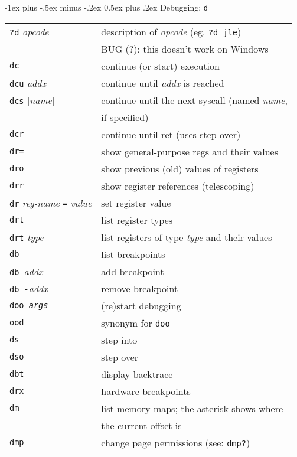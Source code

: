 \documentclass[a4paper,landscape]{article}
\makeatletter
\renewcommand{\section}{\@startsection{section}{1}{0mm}%
                                {-1ex plus -.5ex minus -.2ex}%
                                {0.5ex plus .2ex}%
                                {\normalfont\large\bfseries}}
\makeatother
\begin{document}
\begin{multicols*}{3}
\section{Debugging: \texttt{d}}
\begin{tabular}{@{}ll@{}}
\texttt{?d} \textit{opcode} & description of \textit{opcode} (eg. \texttt{?d jle}) \\ & BUG (?): this doesn't work on Windows \\
\texttt{dc} & continue (or start) execution \\
\texttt{dcu} \textit{addx} & continue until \textit{addx} is reached \\
\texttt{dcs} [\textit{name}] & continue until the next syscall (named \textit{name}, \\ & if specified) \\
\texttt{dcr} & continue until ret (uses step over) \\
\texttt{dr=} & show general-purpose regs and their values \\
\texttt{dro} & show previous (old) values of registers \\
\texttt{drr} & show register references (telescoping) \\
\texttt{dr} \textit{reg-name} \texttt{=} \textit{value} & set register value \\
\texttt{drt} & list register types \\
\texttt{drt} \textit{type} & list registers of type \textit{type} and their values \\
\texttt{db} & list breakpoints \\
\texttt{db }\textit{addx} & add breakpoint \\
\texttt{db -}\textit{addx} & remove breakpoint \\
\texttt{doo \textit{args}} & (re)start debugging \\
\texttt{ood} & synonym for \texttt{doo} \\
\texttt{ds} & step into \\
\texttt{dso} & step over \\
\texttt{dbt} & display backtrace \\
\texttt{drx} & hardware breakpoints \\
\texttt{dm} & list memory maps; the asterisk shows where \\ & the current offset is \\
\texttt{dmp} & change page permissions (see: \texttt{dmp?}) \\
\end{tabular}


\end{multicols*}
\end{document}
